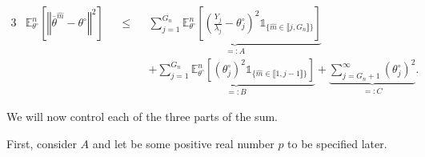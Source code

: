 \begin{alignat*}{3}
& \mathds{E}_{\theta^{\circ}}^{n}\left[\left\Vert \overline{\theta}^{\widehat{m}} - \theta^{\circ} \right\Vert^{2}\right] && \leq && \underbrace{\sum\limits_{j = 1}^{G_{n}}\mathds{E}_{\theta^{\circ}}^{n}\left[\left(\frac{Y_{j}}{\lambda_{j}} - \theta^{\circ}_{j}\right)^{2} \mathds{1}_{\{\widehat{m} \in \llbracket j, G_{n} \rrbracket\}}\right]}_{=: A}\\
& && && + \underbrace{\sum\limits_{j = 1}^{G_{n}}\mathds{E}_{\theta^{\circ}}^{n}\left[\left(\theta^{\circ}_{j}\right)^{2} \mathds{1}_{\{\widehat{m} \in \llbracket 1, j-1 \rrbracket\}}\right]}_{=: B}+ \underbrace{\sum\limits_{j = G_{n} + 1}^{\infty}\left( \theta^{\circ}_{j}\right)^{2}}_{=: C}.
\end{alignat*}

\bigskip

We will now control each of the three parts of the sum.

\bigskip

First, consider $A$ and let be some positive real number $p$ to be specified later.

